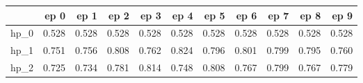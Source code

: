 \begin{tabular}{lrrrrrrrrrr}
\toprule
{} &   ep 0 &   ep 1 &   ep 2 &   ep 3 &   ep 4 &   ep 5 &   ep 6 &   ep 7 &   ep 8 &   ep 9 \\
\midrule
hp\_0 &  0.528 &  0.528 &  0.528 &  0.528 &  0.528 &  0.528 &  0.528 &  0.528 &  0.528 &  0.528 \\
hp\_1 &  0.751 &  0.756 &  0.808 &  0.762 &  0.824 &  0.796 &  0.801 &  0.799 &  0.795 &  0.760 \\
hp\_2 &  0.725 &  0.734 &  0.781 &  0.814 &  0.748 &  0.808 &  0.767 &  0.799 &  0.767 &  0.779 \\
\bottomrule
\end{tabular}
